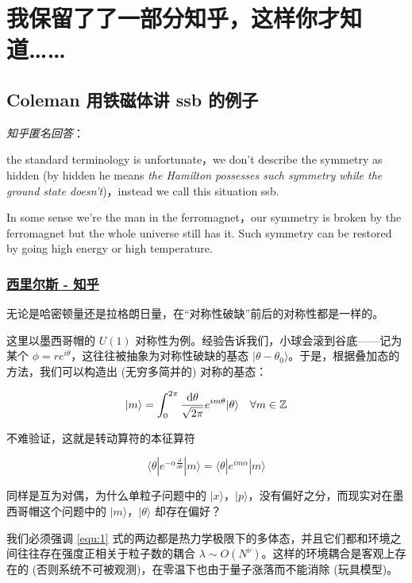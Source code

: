 \chapter{我保留了了一部分知乎，这样你才知道……}

\section{Coleman 用铁磁体讲 ssb 的例子}

\emph{知乎匿名回答}：

the standard terminology is unfortunate，we don't describe the symmetry as hidden (by hidden he means \emph{the Hamilton possesses such symmetry while the ground state doesn't})，instead we call this situation ssb.

In some sense we're the man in the ferromagnet，our symmetry is broken by the ferromagnet but the whole universe still has it. Such symmetry can be restored by going high energy or high temperature.

\subsection{\href{https://www.zhihu.com/people/imserious}{西里尔斯 - 知乎}}

无论是哈密顿量还是拉格朗日量，在“对称性破缺”前后的对称性都是一样的。

这里以墨西哥帽的 $U(1)$ 对称性为例。经验告诉我们，小球会滚到谷底——记为某个 $\phi=r e^{i \theta}$，这往往被抽象为对称性破缺的基态 $|\theta-\theta_0\rangle$。于是，根据叠加态的方法，我们可以构造出 (无穷多简并的) 对称的基态：

\begin{equation}
    |m\rangle = \int_0^{2\pi} \frac{\mathop{}\!\mathrm{d} \theta}{\sqrt{2\pi}} e^{im \theta} |\theta\rangle \quad \forall m \in \mathbb{Z}
    \label{equ:1}
\end{equation}

不难验证，这就是转动算符的本征算符

\begin{equation*}
    \langle\theta| e^{-\alpha \frac{\partial}{\partial \theta}} |m\rangle = \langle\theta| e^{im\alpha} |m\rangle
\end{equation*}

同样是互为对偶，为什么单粒子问题中的 $|x\rangle，|p\rangle$，没有偏好之分，而现实对在墨西哥帽这个问题中的 $|m\rangle，|\theta\rangle$ 却存在偏好？

我们必须强调 \eqref{equ:1} 式的两边都是热力学极限下的多体态，并且它们都和环境之间往往存在强度正相关于粒子数的耦合 $\lambda \sim O(N^\nu)$。这样的环境耦合是客观上存在的 (否则系统不可被观测)，在零温下也由于量子涨落而不能消除 (玩具模型)。

